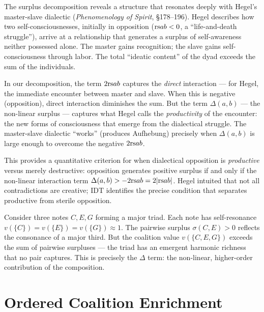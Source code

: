 \begin{interpretation}
\label{interp:ch15:hegel_master_slave}
The surplus decomposition reveals a structure that resonates deeply with
Hegel's master-slave dialectic (\textit{Phenomenology of Spirit}, \S178--196).
Hegel describes how two self-consciousnesses, initially in opposition
($\mathrm{rs}{a}{b} < 0$, a ``life-and-death struggle''), arrive at a relationship
that generates a surplus of self-awareness neither possessed alone.  The
master gains recognition; the slave gains self-consciousness through labor.
The total ``ideatic content'' of the dyad exceeds the sum of the individuals.

In our decomposition, the term $2\mathrm{rs}{a}{b}$ captures the \emph{direct}
interaction --- for Hegel, the immediate encounter between master and slave.
When this is negative (opposition), direct interaction diminishes the sum.
But the term $\Delta(a,b)$ --- the non-linear surplus --- captures what Hegel
calls the \emph{productivity} of the encounter: the new forms of
consciousness that emerge from the dialectical struggle.  The master-slave
dialectic ``works'' (produces Aufhebung) precisely when $\Delta(a,b)$ is
large enough to overcome the negative $2\mathrm{rs}{a}{b}$.

This provides a quantitative criterion for when dialectical opposition is
\emph{productive} versus merely destructive: opposition generates positive
surplus if and only if the non-linear interaction term $\Delta(a,b) >
-2\mathrm{rs}{a}{b} = 2|\mathrm{rs}{a}{b}|$.  Hegel intuited that not all contradictions
are creative; IDT identifies the precise condition that separates
productive from sterile opposition.
\end{interpretation}

\begin{example}
Consider three notes $C, E, G$ forming a major triad.  Each note has
self-resonance $v(\{C\}) = v(\{E\}) = v(\{G\}) \approx 1$.  The pairwise
surplus $\sigma(C, E) > 0$ reflects the consonance of a major third.  But the
coalition value $v(\{C, E, G\})$ exceeds the sum of pairwise surpluses --- the
triad has an emergent harmonic richness that no pair captures.  This is
precisely the $\Delta$ term: the non-linear, higher-order contribution of the
composition.
\end{example}

\section{Ordered Coalition Enrichment}

